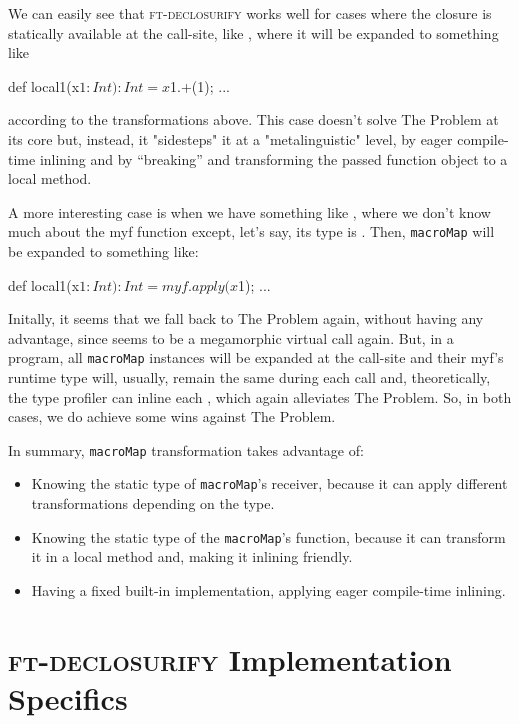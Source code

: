 We can easily see that \textsc{ft-declosurify} works well for cases where the closure
is statically available at the call-site, like ,
where it will be expanded to something like

\begin{scalaCode}
{
  def local1(x$1: Int): Int = x$1.+(1);
  ...
}
\end{scalaCode}
according to the transformations above. This case doesn't solve The Problem
at its core but, instead, it "sidesteps" it at a "metalinguistic" level, by
eager compile-time inlining and by ``breaking'' and transforming the passed function
object to a local method.

A more interesting case is when we have something like , where we don't know much about the myf function except, let's
say, its type is . Then, \texttt{macroMap} will be expanded to something
like:

\begin{scalaCode}
{
 def local1(x$1: Int): Int = myf.apply(x$1);
  ...
}
\end{scalaCode}

Initally, it seems that we fall back to The Problem again, without having any
advantage, since  seems to be a megamorphic virtual call again.
But, in a program, all \texttt{macroMap} instances will be expanded at the call-site and their myf's
runtime type will, usually, remain the same during each call and, theoretically,
the type profiler can inline each , which again alleviates 
The Problem. So, in both cases, we do achieve some wins against The Problem.

In summary, \texttt{macroMap} transformation takes advantage of:
\begin{itemize}
 \item Knowing the static type of \texttt{macroMap}'s receiver, because it can apply different transformations depending on the type.
  \item Knowing the static type of the \texttt{macroMap}'s function, because it can transform it in a local method and, making it inlining friendly.
  \item Having a fixed built-in implementation, applying eager compile-time inlining.
\end{itemize}


\section{\textsc{ft-declosurify} Implementation Specifics}
\label{ft_declosurify_impl}

